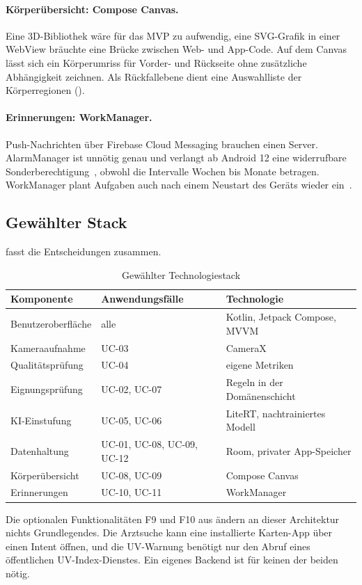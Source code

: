 \paragraph{Körperübersicht: Compose Canvas.} Eine 3D-Bibliothek wäre für das MVP zu aufwendig, eine SVG-Grafik in einer WebView bräuchte eine Brücke zwischen Web- und App-Code. Auf dem Canvas lässt sich ein Körperumriss für Vorder- und Rückseite ohne zusätzliche Abhängigkeit zeichnen. Als Rückfallebene dient eine Auswahlliste der Körperregionen ().

\paragraph{Erinnerungen: WorkManager.} Push-Nachrichten über Firebase Cloud Messaging brauchen einen Server. AlarmManager ist unnötig genau und verlangt ab Android 12 eine widerrufbare Sonderberechtigung~\cite{android-alarms}, obwohl die Intervalle Wochen bis Monate betragen. WorkManager plant Aufgaben auch nach einem Neustart des Geräts wieder ein~\cite{android-workmanager}.

\subsection{Gewählter Stack}

 fasst die Entscheidungen zusammen.

\begin{table}[htbp]
\caption{Gewählter Technologiestack}
\label{tab:stack}
\footnotesize
\renewcommand{\arraystretch}{1.15}
\begin{tabularx}{\textwidth}{@{}l l X@{}}
\toprule
\textbf{Komponente} & \textbf{Anwendungsfälle} & \textbf{Technologie} \\
\midrule
Benutzeroberfläche & alle & Kotlin, Jetpack Compose, MVVM \\
Kameraaufnahme & UC-03 & CameraX \\
Qualitätsprüfung & UC-04 & eigene Metriken \\
Eignungsprüfung & UC-02, UC-07 & Regeln in der Domänenschicht \\
KI-Einstufung & UC-05, UC-06 & LiteRT, nachtrainiertes Modell \\
Datenhaltung & UC-01, UC-08, UC-09, UC-12 & Room, privater App-Speicher \\
Körperübersicht & UC-08, UC-09 & Compose Canvas \\
Erinnerungen & UC-10, UC-11 & WorkManager \\
\bottomrule
\end{tabularx}
\end{table}

Die optionalen Funktionalitäten F9 und F10 aus  ändern an dieser Architektur nichts Grundlegendes. Die Arztsuche kann eine installierte Karten-App über einen Intent öffnen, und die UV-Warnung benötigt nur den Abruf eines öffentlichen UV-Index-Dienstes. Ein eigenes Backend ist für keinen der beiden nötig.
